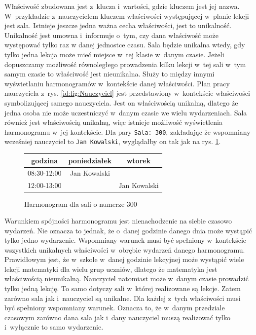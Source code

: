 \documentclass[a4paper]{book}
\begin{document}
Właściwość zbudowana jest z~klucza i~wartości, gdzie kluczem jest jej nazwa. W~przykładzie z~nauczycielem kluczem właściwości występującej w~planie lekcji jest sala. Istnieje jeszcze jedna ważna cecha właściwości, jest to unikalność. Unikalność jest umowna i~informuje o~tym, czy dana właściwość może występować tylko raz w danej jednostce czasu. Sala będzie unikalna wtedy, gdy tylko jedna lekcja może mieć miejsce w~tej klasie w~danym czasie. Jeżeli dopuszczamy możliwość równoległego prowadzenia kilku lekcji w~tej sali w~tym samym czasie to właściwość jest nieunikalna. Służy to między innymi wyświetlaniu harmonogramów w~kontekście danej właściwości. Plan pracy nauczyciela z~rys. \ref{id:fig:Nauczyciel} jest przedstawiony w~kontekście właściwości symbolizującej samego nauczyciela. Jest on właściwością unikalną, dlatego że jedna osoba nie może uczestniczyć w~danym czasie we wielu wydarzeniach. Sala również jest właściwością unikalną, więc istnieje możliwość wyświetlenia harmonogramu w~jej kontekście. Dla pary \lstinline|Sala: 300|, zakładając że wspomniany wcześniej nauczyciel to \lstinline|Jan Kowalski|, wyglądałby on tak jak na rys. \ref{id:fig:Unikalnosc}.
\begin{figure}
	\centering
	\begin{tabular}{ccc}
		\toprule
		  godzina   & poniedziałek &    wtorek    \\
		\midrule
		08:30-12:00 & Jan Kowalski &  \\
		12:00-13:00 &              & Jan Kowalski \\
		\bottomrule
	\end{tabular}
	\caption{Harmonogram dla sali o numerze 300}
	\label{id:fig:Unikalnosc}
\end{figure}

Warunkiem spójności harmonogramu jest nienachodzenie na siebie czasowo wydarzeń. Nie oznacza to jednak, że o~danej godzinie danego dnia może wystąpić tylko jedno wydarzenie. Wspomniany warunek musi być spełniony w~kontekście wszystkich unikalnych właściwości w~obrębie wydarzeń danego harmonogramu. Prawidłowym jest, że w~szkole w~danej godzinie lekcyjnej może wystąpić wiele lekcji matematyki dla wielu grup uczniów, dlatego że matematyka jest właściwością nieunikalną. Nauczyciel natomiast może w~danym czasie prowadzić tylko jedną lekcję. To samo dotyczy sali w~której realizowane są lekcje. Zatem zarówno sala jak i~nauczyciel są unikalne. Dla każdej z~tych właściwości musi być spełniony wspomniany warunek. Oznacza to, że w~danym przedziale czasowym zarówno dana sala jak i~dany nauczyciel muszą realizować tylko i~wyłącznie to samo wydarzenie.
\end{document}

